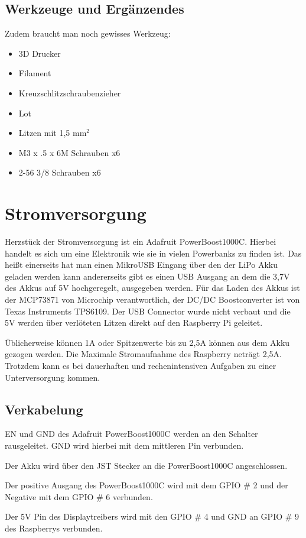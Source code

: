 \subsection{Werkzeuge und Ergänzendes}
Zudem braucht man noch gewisses Werkzeug:
\begin{itemize}
\item 3D Drucker 
\item Filament  
\item Kreuzschlitzschraubenzieher 
\item Lot 
\item Litzen mit 1,5 mm$^2$
\item M3 x .5 x 6M Schrauben x6
\item 2-56 3/8 Schrauben x6
\end{itemize}

\section{Stromversorgung}

Herzstück der Stromversorgung ist ein Adafruit PowerBoost1000C. Hierbei handelt es sich um eine Elektronik wie sie in vielen Powerbanks zu finden ist. Das heißt einerseits hat man einen MikroUSB Eingang über den der LiPo Akku geladen werden kann andererseits gibt es einen USB Ausgang an dem die 3,7V des Akkus auf 5V hochgeregelt, ausgegeben werden. Für das Laden des Akkus ist der MCP73871 von Microchip verantwortlich, der DC/DC Boostconverter ist von Texas Instruments TPS6109. Der USB Connector wurde nicht verbaut und die 5V werden über verlöteten Litzen direkt auf den Raspberry Pi geleitet. 

Üblicherweise können 1A oder Spitzenwerte bis zu 2,5A können aus dem Akku gezogen werden. Die Maximale Stromaufnahme des Raspberry neträgt 2,5A. Trotzdem kann es bei dauerhaften und rechenintensiven Aufgaben zu einer Unterversorgung kommen. 

\subsection{Verkabelung}

EN und GND des Adafruit PowerBoost1000C werden an den Schalter rausgeleitet. GND wird hierbei mit dem mittleren Pin verbunden. 

Der Akku wird über den JST Stecker an die PowerBoost1000C angeschlossen. 

Der positive Ausgang des PowerBoost1000C wird mit dem GPIO \# 2 und der Negative mit dem GPIO \# 6 verbunden. 

Der 5V Pin des Displaytreibers wird mit den GPIO \# 4 und GND an GPIO \# 9 des Raspberrys verbunden. 

